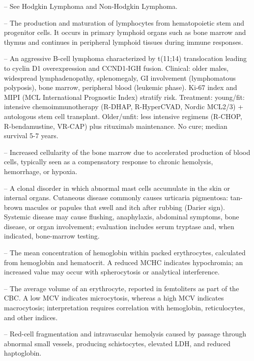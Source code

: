 -- See Hodgkin Lymphoma and Non-Hodgkin Lymphoma.

-- The production and maturation of lymphocytes from hematopoietic stem and progenitor cells. It occurs in primary lymphoid organs such as bone marrow and thymus and continues in peripheral lymphoid tissues during immune responses.

-- An aggressive B-cell lymphoma characterized by t(11;14) translocation leading to cyclin D1 overexpression and CCND1-IGH fusion. Clinical: older males, widespread lymphadenopathy, splenomegaly, GI involvement (lymphomatous polyposis), bone marrow, peripheral blood (leukemic phase). Ki-67 index and MIPI (MCL International Prognostic Index) stratify risk. Treatment: young/fit: intensive chemoimmunotherapy (R-DHAP, R-HyperCVAD, Nordic MCL2/3) + autologous stem cell transplant. Older/unfit: less intensive regimens (R-CHOP, R-bendamustine, VR-CAP) plus rituximab maintenance. No cure; median survival 5-7 years.

-- Increased cellularity of the bone marrow due to accelerated production of blood cells, typically seen as a compensatory response to chronic hemolysis, hemorrhage, or hypoxia.

-- A clonal disorder in which abnormal mast cells accumulate in the skin or internal organs. Cutaneous disease commonly causes urticaria pigmentosa: tan-brown macules or papules that swell and itch after rubbing (Darier sign). Systemic disease may cause flushing, anaphylaxis, abdominal symptoms, bone disease, or organ involvement; evaluation includes serum tryptase and, when indicated, bone-marrow testing.

-- The mean concentration of hemoglobin within packed erythrocytes, calculated from hemoglobin and hematocrit. A reduced MCHC indicates hypochromia; an increased value may occur with spherocytosis or analytical interference.

-- The average volume of an erythrocyte, reported in femtoliters as part of the CBC. A low MCV indicates microcytosis, whereas a high MCV indicates macrocytosis; interpretation requires correlation with hemoglobin, reticulocytes, and other indices.

-- Red-cell fragmentation and intravascular hemolysis caused by passage through abnormal small vessels, producing schistocytes, elevated LDH, and reduced haptoglobin.

